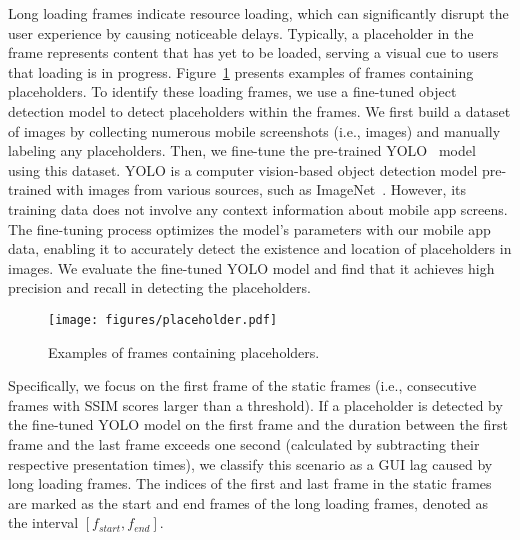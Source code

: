  Long loading frames indicate resource loading, which can significantly disrupt the user experience by causing noticeable delays. Typically, a placeholder in the frame represents content that has yet to be loaded, serving a visual cue to users that loading is in progress. Figure~\ref{fig_placeholder} presents examples of frames containing placeholders. To identify these loading frames, we use a fine-tuned object detection model to detect placeholders within the frames. We first build a dataset of images by collecting numerous mobile screenshots (i.e., images) and manually labeling any placeholders. Then, we fine-tune the pre-trained YOLO~\cite{yolov} model using this dataset. %
YOLO is a computer vision-based object detection model pre-trained with images from various sources, such as ImageNet~\cite{ImageNet}. However, its training data does not involve any context information about mobile app screens. The fine-tuning process optimizes the model's parameters with our mobile app data, enabling it to accurately detect the existence and location of placeholders in images. We evaluate the fine-tuned YOLO model and find that it achieves high precision and recall in detecting the placeholders. 

\begin{figure}
	\centering
    \texttt{[image: figures/placeholder.pdf]}
	\caption{Examples of frames containing placeholders.}
	\label{fig_placeholder}
 \vspace{-3mm}
\end{figure}


Specifically, we focus on the first frame of the static frames (i.e., consecutive frames with SSIM scores larger than a threshold). If a placeholder is detected by the fine-tuned YOLO model on the first frame and the duration between the first frame and the last frame exceeds one second (calculated by subtracting their respective presentation times), we classify this scenario as a GUI lag caused by long loading frames. The indices of the first and last frame in the static frames are marked as the start and end frames of the long loading frames, denoted as the interval $[f_{start}, f_{end}]$. 


